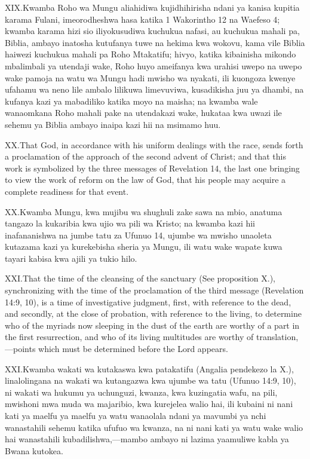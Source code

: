 \lettrine{XIX.} Kwamba Roho wa Mungu aliahidiwa kujidhihirisha ndani ya kanisa kupitia karama Fulani, imeorodheshwa hasa katika 1 Wakorintho 12 na Waefeso 4; kwamba karama hizi sio iliyokusudiwa kuchukua nafasi, au kuchukua mahali pa, Biblia, ambayo inatosha kutufanya tuwe na hekima kwa wokovu, kama vile Biblia haiwezi kuchukua mahali pa Roho Mtakatifu; hivyo, katika kibainisha mikondo mbalimbali ya utendaji wake, Roho huyo ameifanya kwa urahisi uwepo na uwepo wake pamoja na watu wa Mungu hadi mwisho wa nyakati, ili kuongoza kwenye ufahamu wa neno lile ambalo lilikuwa limevuviwa, kusadikisha juu ya dhambi, na kufanya kazi ya mabadiliko katika moyo na maisha; na kwamba wale wanaomkana Roho mahali pake na utendakazi wake, hukataa kwa uwazi ile sehemu ya Biblia ambayo inaipa kazi hii na msimamo huu.


\lettrine{XX.} That God, in accordance with his uniform dealings with the race, sends forth a proclamation of the approach of the second advent of Christ; and that this work is symbolized by the three messages of Revelation 14, the last one bringing to view the work of reform on the law of God, that his people may acquire a complete readiness for that event.


\lettrine{XX.} Kwamba Mungu, kwa mujibu wa shughuli zake sawa na mbio, anatuma tangazo la kukaribia kwa ujio wa pili wa Kristo; na kwamba kazi hii inafananishwa na jumbe tatu za Ufunuo 14, ujumbe wa mwisho unaoleta kutazama kazi ya kurekebisha sheria ya Mungu, ili watu wake wapate kuwa tayari kabisa kwa ajili ya tukio hilo.


\lettrine{XXI.} That the time of the cleansing of the sanctuary (See proposition X.), synchronizing with the time of the proclamation of the third message (Revelation 14:9, 10), is a time of investigative judgment, first, with reference to the dead, and secondly, at the close of probation, with reference to the living, to determine who of the myriads now sleeping in the dust of the earth are worthy of a part in the first resurrection, and who of its living multitudes are worthy of translation,—points which must be determined before the Lord appears.


\lettrine{XXI.} Kwamba wakati wa kutakaswa kwa patakatifu (Angalia pendekezo la X.), linalolingana na wakati wa kutangazwa kwa ujumbe wa tatu (Ufunuo 14:9, 10), ni wakati wa hukumu ya uchunguzi, kwanza, kwa kuzingatia wafu, na pili, mwishoni mwa muda wa majaribio, kwa kurejelea walio hai, ili kubaini ni nani kati ya maelfu ya maelfu ya watu wanaolala ndani ya mavumbi ya nchi wanastahili sehemu katika ufufuo wa kwanza, na ni nani kati ya watu wake walio hai wanastahili kubadilishwa,—mambo ambayo ni lazima yaamuliwe kabla ya Bwana kutokea.


